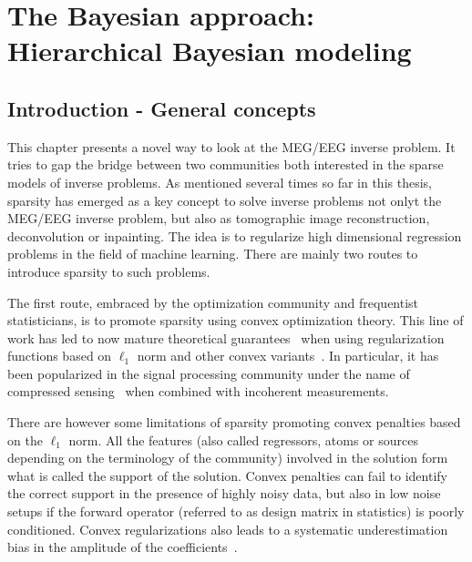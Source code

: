 
\chapter{The Bayesian approach: Hierarchical Bayesian modeling}
\label{chapter:bayesian}
\noindent\makebox[\linewidth]{\rule{0.75\paperwidth}{0.4pt}}
\noindent\makebox[\linewidth]{\rule{0.75\paperwidth}{0.4pt}}

\localtableofcontents %

\noindent\makebox[\linewidth]{\rule{0.75\paperwidth}{0.4pt}}
\noindent\makebox[\linewidth]{\rule{0.75\paperwidth}{0.4pt}}

\newpage

\section{Introduction - General concepts}
\label{sec:bayes_intro}

This chapter presents a novel way to look at the MEG/EEG inverse problem. It tries to gap the bridge between two communities both interested in the sparse models of inverse problems. As mentioned several times so far in this thesis, sparsity has emerged as a key concept to solve inverse problems not onlyt the MEG/EEG inverse problem, but also as tomographic image reconstruction, deconvolution or inpainting. The idea is to regularize high dimensional regression problems in the field of machine learning. There are mainly two routes to introduce sparsity to such problems.

The first route, embraced by the optimization community and frequentist
statisticians, is to promote sparsity using convex optimization theory.
This line of work has led to now mature theoretical guarantees~\cite{FoRa13} when using regularization functions based on $\ell_1$ norm and other convex variants~\cite{Tibshirani96}. In particular, it has been popularized in the signal processing community under the name of compressed sensing~\cite{candes2008introduction} when combined with incoherent measurements.

There are however some limitations of sparsity promoting convex penalties based on the $\ell_1$ norm.
All the features (also called regressors, atoms or sources depending on the terminology of the community) involved in the solution form what is called the support of the solution.
Convex penalties can fail to identify the correct support in the presence of highly noisy data, but also in low noise setups if the forward operator (referred to as design matrix in statistics) is poorly conditioned. Convex regularizations also leads to a systematic underestimation bias in the amplitude of the coefficients~\cite{OsBuGoXuYi06,Candes,chartrand2007exact,saab2008stable,ChHeSa17}.

